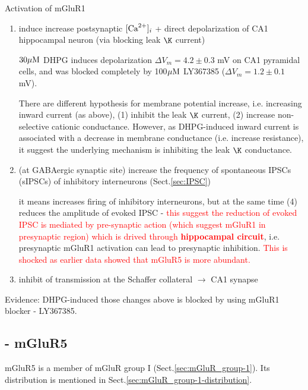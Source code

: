 Activation of mGluR1
\begin{enumerate}
  \item induce increase postsynaptic $[{\text{Ca}^{2+}}]_i$ + direct depolarization of CA1
  hippocampal neuron (via blocking leak $\K$ current)
 
  
  $30{\mu\text{M}}$ DHPG induces depolarization $\Delta V_m = 4.2\pm 0.3$ mV on CA1
  pyramidal cells, and was blocked completely by 100${\mu\text{M}}$ LY367385 
  ($\Delta V_m = 1.2\pm 0.1$ mV).
  
   There are different hypothesis for membrane potential increase, i.e.
  increasing inward current (as above), (1) inhibit the leak $\K$ current, (2)
  increase non-selective cationic conductance. However, as DHPG-induced inward
  current is associated with a decrease in membrane conductance (i.e. increase
  resistance), it suggest the underlying mechanism is inhibiting the leak $\K$
  conductance.
   
   \item (at GABAergic synaptic site) increase the frequency of spontaneous
   IPSCs (sIPSCs) of   inhibitory interneurons (Sect.\ref{sec:IPSC})
 
  it means increases firing of inhibitory interneurons, but at the same time (4)
  reduces the amplitude of evoked IPSC - \textcolor{red}{this suggest the reduction of
  evoked IPSC is mediated by pre-synaptic action (which suggest mGluR1 in
  presynaptic region) which is drived through
  {\bf hippocampal circuit}}, i.e. presynaptic mGluR1 activation can lead to
  presynaptic inhibition.
  \textcolor{red}{This is shocked as earlier data showed that mGluR5 is more abundant.}
 
  
  \item inhibit of transmission at the Schaffer collateral $\rightarrow$ CA1
  synapse
  
  
\end{enumerate}
\citep{mannaioni2001}

Evidence: DHPG-induced those changes above is blocked by using
mGluR1 blocker - LY367385.




\subsection{- mGluR5}
\label{sec:mGluR5}

mGluR5 is a member of mGluR group I (Sect.\ref{sec:mGluR_group-1}). Its
distribution is mentioned in Sect.\ref{sec:mGluR_group-1-distribution}.

